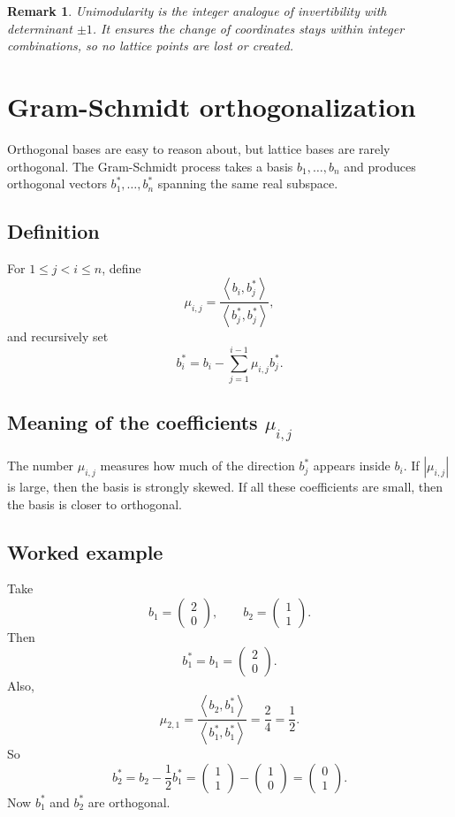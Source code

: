 \documentclass[11pt]{article}
\newtheorem{remark}[theorem]{Remark}
\newcommand{\ip}[2]{\left\langle #1,#2 \right\rangle}
\begin{document}
\begin{remark}
Unimodularity is the integer analogue of invertibility with determinant $\pm 1$. It ensures the change of coordinates stays within integer combinations, so no lattice points are lost or created.
\end{remark}

\section{Gram-Schmidt orthogonalization}

Orthogonal bases are easy to reason about, but lattice bases are rarely orthogonal. The Gram-Schmidt process takes a basis $b_1,\dots,b_n$ and produces orthogonal vectors $b_1^*,\dots,b_n^*$ spanning the same real subspace.

\subsection{Definition}
For $1\le j<i\le n$, define
\[
\mu_{i,j}=\frac{\ip{b_i}{b_j^*}}{\ip{b_j^*}{b_j^*}},
\]
and recursively set
\[
b_i^*=b_i-\sum_{j=1}^{i-1} \mu_{i,j} b_j^*.
\]

\subsection{Meaning of the coefficients $\mu_{i,j}$}
The number $\mu_{i,j}$ measures how much of the direction $b_j^*$ appears inside $b_i$. If $|\mu_{i,j}|$ is large, then the basis is strongly skewed. If all these coefficients are small, then the basis is closer to orthogonal.

\subsection{Worked example}
Take
\[
b_1=\begin{pmatrix}2\\0\end{pmatrix},
\qquad
b_2=\begin{pmatrix}1\\1\end{pmatrix}.
\]
Then
\[
b_1^*=b_1=\begin{pmatrix}2\\0\end{pmatrix}.
\]
Also,
\[
\mu_{2,1}=\frac{\ip{b_2}{b_1^*}}{\ip{b_1^*}{b_1^*}} = \frac{2}{4}=\frac12.
\]
So
\[
b_2^*=b_2-\frac12 b_1^* = \begin{pmatrix}1\\1\end{pmatrix}-\begin{pmatrix}1\\0\end{pmatrix} = \begin{pmatrix}0\\1\end{pmatrix}.
\]
Now $b_1^*$ and $b_2^*$ are orthogonal.
\end{document}
